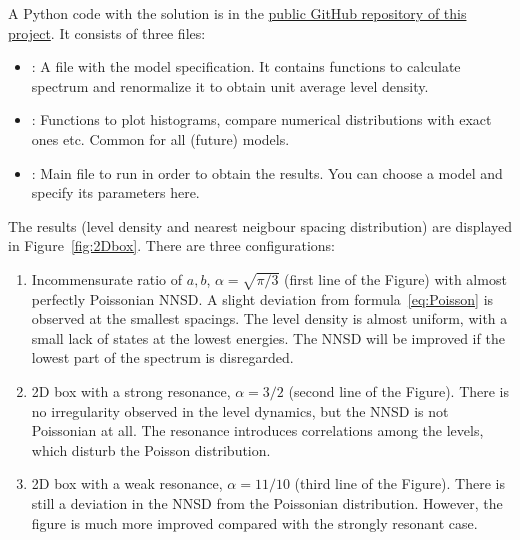 \documentclass[a4paper,11pt,twoside]{article}
\begin{document}
        \begin{solution}
            A Python code with the solution is in the \href{https://github.com/PavelStransky/Chaos}{public GitHub repository of this project}.
            It consists of three files: 
            \begin{itemize}
                \item 
                    : A file with the model specification. 
                    It contains functions to calculate spectrum and renormalize it to obtain unit average level density.
                \item
                    : Functions to plot histograms, compare numerical distributions with exact ones etc.
                    Common for all (future) models.
                \item
                    : Main file to run in order to obtain the results.
                    You can choose a model and specify its parameters here.
            \end{itemize}
            The results (level density and nearest neigbour spacing distribution) are displayed in Figure~\ref{fig:2Dbox}.
            There are three configurations:
            \begin{enumerate}
                \item 
                    Incommensurate ratio of $a,b$, $\alpha=\sqrt{\pi/3}$ (first line of the Figure) with almost perfectly Poissonian NNSD. 
                    A slight deviation from formula~\eqref{eq:Poisson} is observed at the smallest spacings.
                    The level density is almost uniform, with a small lack of states at the lowest energies.
                    The NNSD will be improved if the lowest part of the spectrum is disregarded.
                \item
                    2D box with a strong resonance, $\alpha=3/2$ (second line of the Figure).
                    There is no irregularity observed in the level dynamics, but the NNSD is not Poissonian at all.
                    The resonance introduces correlations among the levels, which disturb the Poisson distribution.
                \item
                    2D box with a weak resonance, $\alpha=11/10$ (third line of the Figure).
                    There is still a deviation in the NNSD from the Poissonian distribution.
                    However, the figure is much more improved compared with the strongly resonant case. 
            \end{enumerate}


\end{solution}
\end{document}
